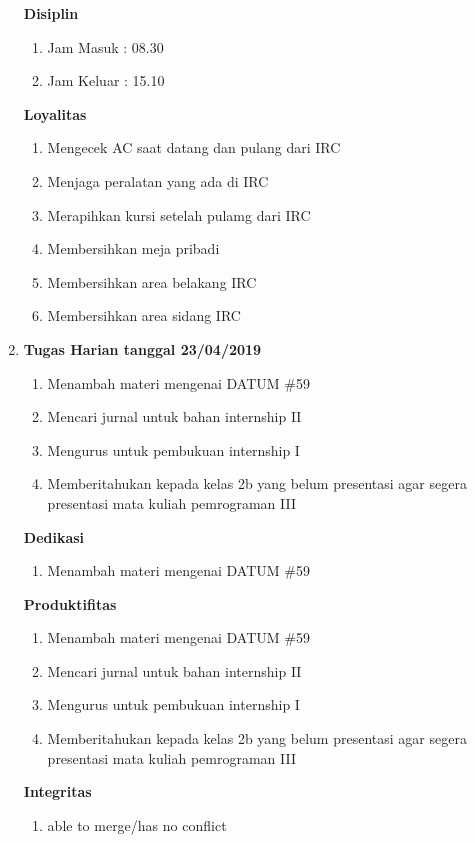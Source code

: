 \begin{enumerate}
\textbf{Disiplin}
\begin{enumerate}
\item Jam Masuk : 08.30
\item Jam Keluar : 15.10
\end{enumerate}

\textbf{Loyalitas}
\begin{enumerate}
\item Mengecek AC saat datang dan pulang dari IRC
\item Menjaga peralatan yang ada di IRC
\item Merapihkan kursi setelah pulamg dari IRC
\item Membersihkan meja pribadi
\item Membersihkan area belakang IRC
\item Membersihkan area sidang IRC
\end{enumerate}

\item \textbf{Tugas Harian tanggal 23/04/2019}
\begin{enumerate}
\item Menambah materi mengenai DATUM \#59 
\item Mencari jurnal untuk bahan internship II
\item Mengurus untuk pembukuan internship I 
\item Memberitahukan kepada kelas 2b yang belum presentasi agar segera presentasi mata kuliah pemrograman III
\end{enumerate}

\textbf{Dedikasi}
\begin{enumerate}
\item Menambah materi mengenai DATUM \#59 
\end{enumerate}

\textbf{Produktifitas}
\begin{enumerate}
\item Menambah materi mengenai DATUM \#59 
\item Mencari jurnal untuk bahan internship II
\item Mengurus untuk pembukuan internship I 
\item Memberitahukan kepada kelas 2b yang belum presentasi agar segera presentasi mata kuliah pemrograman III
\end{enumerate}

\textbf{Integritas}
\begin{enumerate}
\item able to merge/has no conflict
\end{enumerate}


\end{enumerate}
